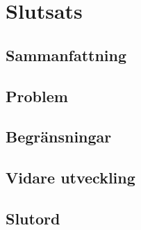 \documentclass{kaumasters} %
\begin{document}
\chapter{Slutsats}
\section{Sammanfattning}
\section{Problem}
\section{Begränsningar}
\newpage
\section{Vidare utveckling}
\section{Slutord}



 



\restoregeometry%
\end{document}
